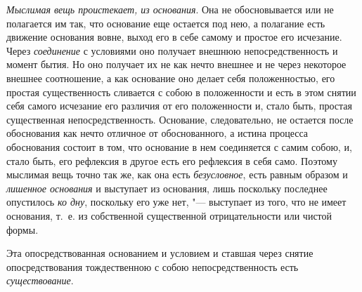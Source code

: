 {\em Мыслимая вещь проистекает, из основания}. Она не обосновывается или не
полагается им так, что основание еще остается под нею, а полагание есть
движение основания вовне, выход его в себе самому и простое его исчезание.
Через {\em соединение} с условиями оно получает внешнюю непосредственность и
момент бытия. Но оно получает их не как нечто внешнее и не через некоторое
внешнее соотношение, а как основание оно делает себя положенностью, его простая
существенность сливается с собою в положенности и есть в этом снятии себя
самого исчезание его различия от его положенности и, стало быть, простая
существенная непосредственность. Основание, следовательно, не остается после
обоснования как нечто отличное от обоснованного, а истина процесса обоснования
состоит в том, что основание в нем соединяется с самим собою, и, стало быть,
его рефлексия в другое есть его рефлексия в себя само. Поэтому мыслимая вещь
точно так же, как она есть {\em безусловное}, есть равным образом
и {\em лишенное основания} и выступает из основания, лишь поскольку последнее
опустилось {\em ко дну}, поскольку его уже нет, "--- выступает из того, что не
имеет основания, т.~е. из собственной существенной отрицательности или
чистой формы.

Эта опосредствованная основанием и условием и ставшая через снятие
опосредствования тождественною с собою непосредственность есть
{\em существование}.

\bigskip
